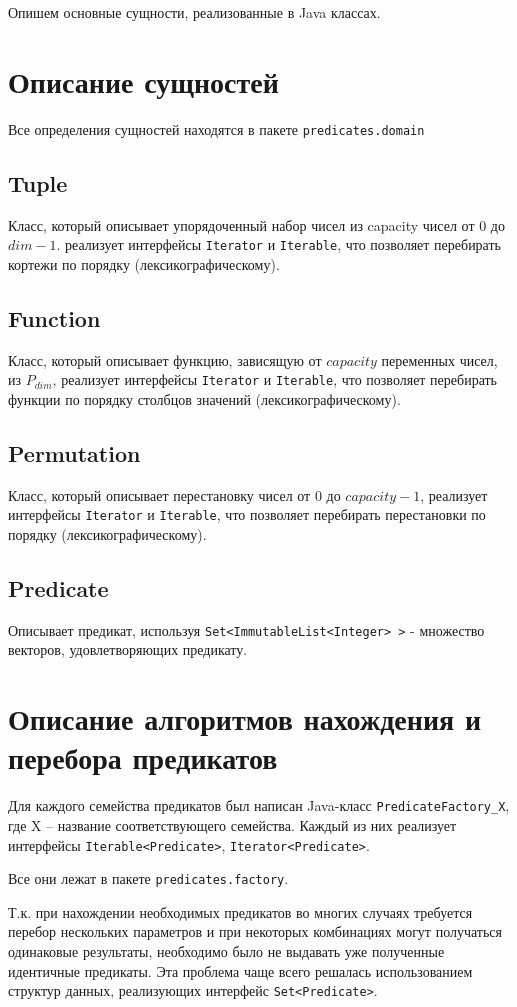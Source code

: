\documentclass[a4paper,14pt]{extreport}
\begin{document}
Опишем основные сущности, реализованные в Java классах.

\section{Описание сущностей}
Все определения сущностей находятся в пакете {\tt predicates.domain}
\subsection{Tuple}
Класс, который описывает упорядоченный набор чисел из capacity чисел от $0$ до $dim-1$. реализует интерфейсы {\tt Iterator} и {\tt Iterable}, что позволяет перебирать кортежи по порядку (лексикографическому).
\subsection{Function}
Класс, который описывает функцию, зависящую от $capacity$ переменных чисел, из $P_{dim}$, реализует интерфейсы {\tt Iterator} и {\tt Iterable}, что позволяет перебирать функции по порядку столбцов значений (лексикографическому).
\subsection{Permutation}
Класс, который описывает перестановку чисел от $0$ до $capacity-1$, реализует интерфейсы {\tt Iterator} и {\tt Iterable}, что позволяет перебирать перестановки по порядку (лексикографическому).
\subsection{Predicate} 
Описывает предикат, используя {\tt Set<ImmutableList<Integer> >} - множество векторов, удовлетворяющих предикату.

\section{Описание алгоритмов нахождения и перебора предикатов}
Для каждого семейства предикатов был написан Java-класс {\tt PredicateFactory\_X}, где X – название соответствующего семейства. Каждый из них реализует интерфейсы {\tt Iterable<Predicate>}, {\tt Iterator<Predicate>}.

Все они лежат в пакете {\tt predicates.factory}.

Т.к. при нахождении необходимых предикатов во многих случаях требуется перебор нескольких параметров и при некоторых комбинациях могут получаться  одинаковые результаты, необходимо было не выдавать уже полученные идентичные предикаты. Эта  проблема чаще всего решалась использованием структур данных, реализующих интерфейс {\tt Set<Predicate>}. 
\end{document}
